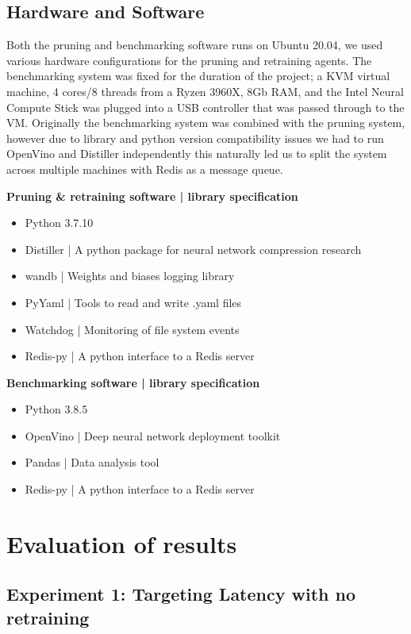 \documentclass[../Dissertation.tex]{subfiles}
\begin{document}
\subsection{Hardware and Software}
Both the pruning and benchmarking software runs on Ubuntu 20.04, we used various hardware configurations for the pruning and retraining agents. 
The benchmarking system was fixed for the duration of the project; a KVM virtual machine, 4 cores/8 threads from a Ryzen 3960X, 8Gb RAM, and the Intel Neural Compute Stick was plugged into a USB controller that was passed through to the VM.
Originally the benchmarking system was combined with the pruning system, however due to library and python version compatibility issues we had to run OpenVino and Distiller independently this naturally led us to split the system across multiple machines with Redis as a message queue.


\noindent\textbf{Pruning \& retraining software | library specification}
\begin{itemize}
    \item Python 3.7.10
    \item Distiller | A python package for neural network compression research
    \item wandb | Weights and biases logging library
    \item PyYaml | Tools to read and write .yaml files
    \item Watchdog | Monitoring of file system events
    \item Redis-py | A python interface to a Redis server
\end{itemize}

\noindent\textbf{Benchmarking software | library specification}
\begin{itemize}
    \item Python 3.8.5
    \item OpenVino | Deep neural network deployment toolkit
    \item Pandas | Data analysis tool
    \item Redis-py | A python interface to a Redis server
\end{itemize}



\section{Evaluation of results}

\subsection{Experiment 1: Targeting Latency with no retraining}\label{sec:FastPruningPhase}
\end{document}

